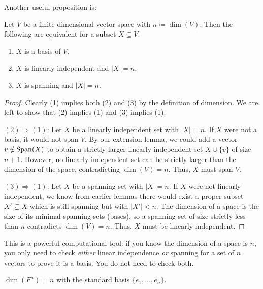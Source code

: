 \documentclass[../linear_algebra_and_groups.tex]{subfiles}
\begin{document}
Another useful proposition is:
\begin{proposition}
    \begin{shaded*}
        Let $V$ be a finite-dimensional vector space with $n \coloneqq \dim(V)$. Then the following are equivalent for a subset $X\subseteq V$:
        \begin{enumerate}
            \item $X$ is a basis of $V$.
            \item $X$ is linearly independent and $|X|=n$.
            \item $X$ is spanning and $|X|=n$.
        \end{enumerate}
    \end{shaded*}
\end{proposition}
\begin{proof}
    Clearly (1) implies both (2) and (3) by the definition of dimension. We are left to show that (2) implies (1) and (3) implies (1).
    
    \textit{$(2)\Rightarrow (1)$}: Let $X$ be a linearly independent set with $|X|=n$. If $X$ were not a basis, it would not span $V$. By our extension lemma, we could add a vector $v\notin\operatorname{Span}(X)$ to obtain a strictly larger linearly independent set $X\cup \{v\}$ of size $n+1$. However, no linearly independent set can be strictly larger than the dimension of the space, contradicting $\dim(V)=n$. Thus, $X$ must span $V$.
    
    \textit{$(3)\Rightarrow (1)$}: Let $X$ be a spanning set with $|X|=n$. If $X$ were not linearly independent, we know from earlier lemmas there would exist a proper subset $X'\subsetneq X$ which is still spanning but with $|X'|<n$. The dimension of a space is the size of its minimal spanning sets (bases), so a spanning set of size strictly less than $n$ contradicts $\dim(V)=n$. Thus, $X$ must be linearly independent.
    \qedhere
\end{proof}

\begin{remark}
    This is a powerful computational tool: if you know the dimension of a space is $n$, you only need to check \textit{either} linear independence \textit{or} spanning for a set of $n$ vectors to prove it is a basis. You do not need to check both.
\end{remark}

\begin{example}
    $\dim(F^n)=n$ with the standard basis $\{e_1,\dots,e_n\}$.
\end{example}
\end{document}
